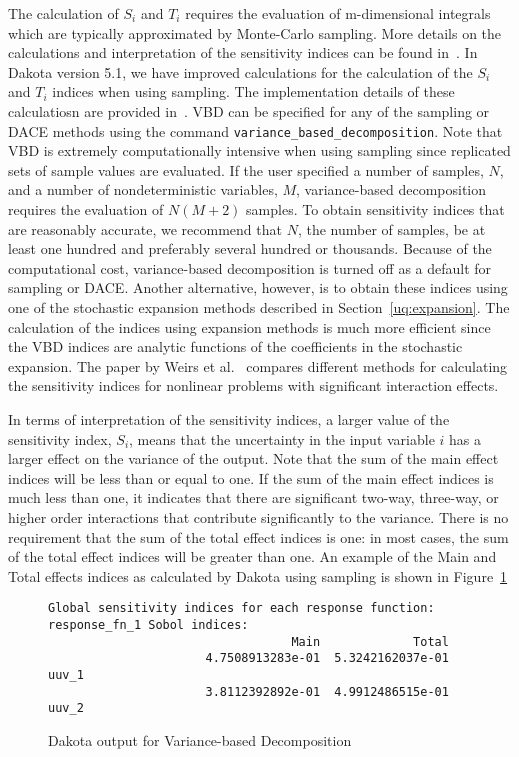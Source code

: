 The calculation of $S_{i}$ and $T_{i}$ requires the evaluation of 
m-dimensional integrals which are typically approximated by Monte-Carlo 
sampling. More details on the
calculations and interpretation of the sensitivity indices can be
found in~\cite{Sal04}. In Dakota version 5.1, we have 
improved calculations for the calculation of the $S_{i}$ and $T_{i}$ 
indices when using sampling. The implementation details of these 
calculatiosn are provided in~\cite{Weirs10}. 
VBD can be specified for any of the sampling or DACE methods using the 
command \texttt{variance\_based\_decomposition}.
Note that VBD is extremely computationally intensive when using sampling 
since replicated sets of sample values are evaluated. If the
user specified a number of samples, $N$, and a number of
nondeterministic variables, $M$, variance-based decomposition
requires the evaluation of $N(M+2)$ samples. To obtain
sensitivity indices that are reasonably accurate, we recommend that
$N$, the number of samples, be at least one hundred and
preferably several hundred or thousands. Because of the computational
cost, variance-based decomposition is turned off as a default
for sampling or DACE. Another alternative, however, is to obtain 
these indices using one of the stochastic expansion methods 
described in Section~\ref{uq:expansion}. The calculation 
of the indices using expansion methods is much more efficient 
since the VBD indices are analytic functions of the coefficients 
in the stochastic expansion. The paper by Weirs et al.~\cite{Weirs10}
compares different methods for calculating the sensitivity 
indices for nonlinear problems with significant interaction effects.

In terms of interpretation of the sensitivity indices, a larger value of
the sensitivity index, $S_{i}$,
means that the uncertainty in the input variable $i$ has a
larger effect on the variance of the output. Note that the 
sum of the main effect indices will be less than or equal to one. 
If the sum of the main effect indices is much less than one, 
it indicates that there are significant two-way, three-way, or higher
order interactions that contribute significantly to the variance. 
There is no requirement that the sum of the total effect indices 
is one:  in most cases, the sum of the total effect indices will be 
greater than one. An example of the Main and Total effects 
indices as calculated by Dakota using sampling is shown 
in Figure~\ref{fig:dace:vbd}

\begin{figure}[ht!]
\centering
\begin{bigbox}
\begin{small}
\begin{verbatim}
Global sensitivity indices for each response function:
response_fn_1 Sobol indices:
                                  Main             Total
                      4.7508913283e-01  5.3242162037e-01 uuv_1
                      3.8112392892e-01  4.9912486515e-01 uuv_2
\end{verbatim}
\end{small}
\end{bigbox}
\caption{Dakota output for Variance-based Decomposition} 
\label{fig:dace:vbd}
\end{figure}

